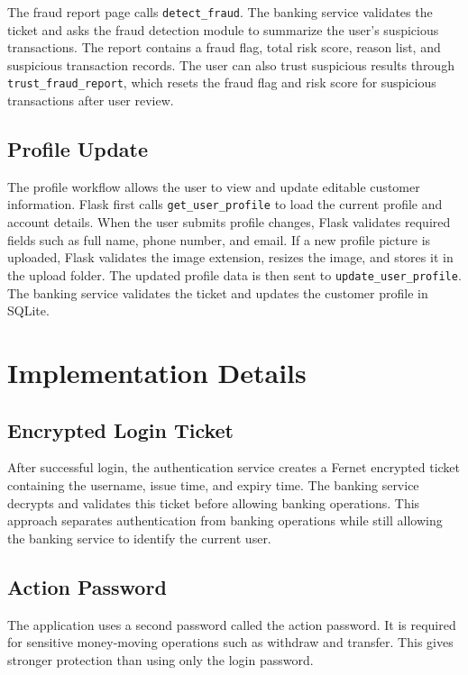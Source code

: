 \documentclass[12pt,a4paper]{article}
\newcommand{\sectionbreakguard}{\Needspace{8\baselineskip}}
\newcommand{\subsectionbreakguard}{\Needspace{5\baselineskip}}
\begin{document}
The fraud report page calls \texttt{detect\_fraud}. The banking service validates the ticket and asks the fraud detection module to summarize the user's suspicious transactions. The report contains a fraud flag, total risk score, reason list, and suspicious transaction records. The user can also trust suspicious results through \texttt{trust\_fraud\_report}, which resets the fraud flag and risk score for suspicious transactions after user review.

\subsectionbreakguard
\subsection{Profile Update}

The profile workflow allows the user to view and update editable customer information. Flask first calls \texttt{get\_user\_profile} to load the current profile and account details. When the user submits profile changes, Flask validates required fields such as full name, phone number, and email. If a new profile picture is uploaded, Flask validates the image extension, resizes the image, and stores it in the upload folder. The updated profile data is then sent to \texttt{update\_user\_profile}. The banking service validates the ticket and updates the customer profile in SQLite.

\sectionbreakguard
\section{Implementation Details}

\subsectionbreakguard
\subsection{Encrypted Login Ticket}

After successful login, the authentication service creates a Fernet encrypted ticket containing the username, issue time, and expiry time. The banking service decrypts and validates this ticket before allowing banking operations. This approach separates authentication from banking operations while still allowing the banking service to identify the current user.

\subsectionbreakguard
\subsection{Action Password}

The application uses a second password called the action password. It is required for sensitive money-moving operations such as withdraw and transfer. This gives stronger protection than using only the login password.
\end{document}
